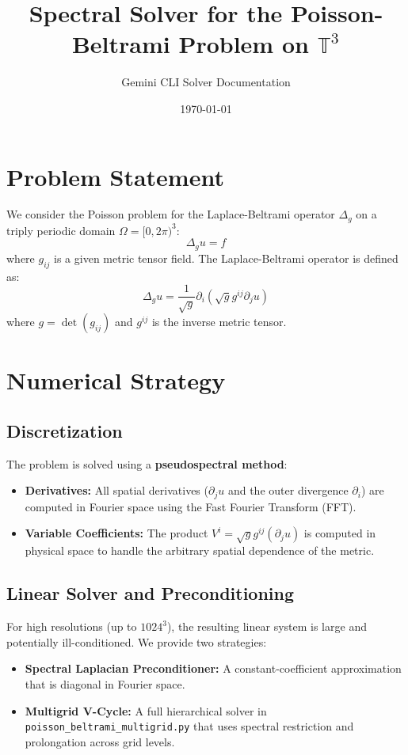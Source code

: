\documentclass[11pt]{article}
\title{Spectral Solver for the Poisson-Beltrami Problem on $\mathbb{T}^3$}
\author{Gemini CLI Solver Documentation}
\date{\today}
\begin{document}
\maketitle

\section{Problem Statement}
We consider the Poisson problem for the Laplace-Beltrami operator $\Delta_g$ on a triply periodic domain $\Omega = [0, 2\pi)^3$:
\begin{equation}
    \Delta_g u = f
\end{equation}
where $g_{ij}$ is a given metric tensor field. The Laplace-Beltrami operator is defined as:
\begin{equation}
    \Delta_g u = \frac{1}{\sqrt{g}} \partial_i \left( \sqrt{g} g^{ij} \partial_j u \right)
\end{equation}
where $g = \det(g_{ij})$ and $g^{ij}$ is the inverse metric tensor.

\section{Numerical Strategy}
\subsection{Discretization}
The problem is solved using a \textbf{pseudospectral method}:
\begin{itemize}
    \item \textbf{Derivatives:} All spatial derivatives ($\partial_j u$ and the outer divergence $\partial_i$) are computed in Fourier space using the Fast Fourier Transform (FFT).
    \item \textbf{Variable Coefficients:} The product $V^i = \sqrt{g} g^{ij} (\partial_j u)$ is computed in physical space to handle the arbitrary spatial dependence of the metric.
\end{itemize}

\subsection{Linear Solver and Preconditioning}
For high resolutions (up to $1024^3$), the resulting linear system is large and potentially ill-conditioned. We provide two strategies:
\begin{itemize}
    \item \textbf{Spectral Laplacian Preconditioner:} A constant-coefficient approximation that is diagonal in Fourier space.
    \item \textbf{Multigrid V-Cycle:} A full hierarchical solver in \texttt{poisson\_beltrami\_multigrid.py} that uses spectral restriction and prolongation across grid levels.
\end{itemize}
\end{document}

